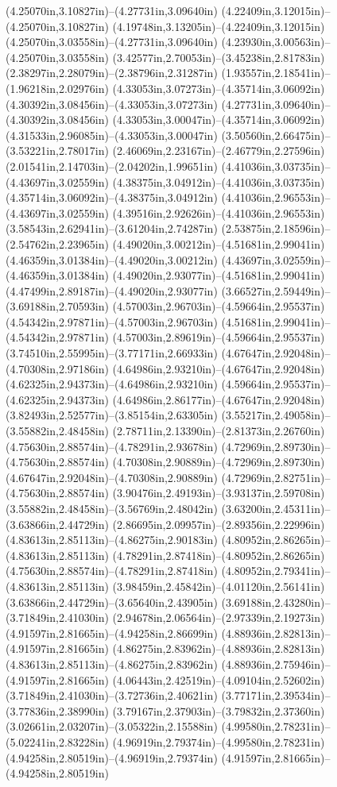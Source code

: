 (4.25070in,3.10827in)--(4.27731in,3.09640in) (4.22409in,3.12015in)--(4.25070in,3.10827in) (4.19748in,3.13205in)--(4.22409in,3.12015in) (4.25070in,3.03558in)--(4.27731in,3.09640in) (4.23930in,3.00563in)--(4.25070in,3.03558in) (3.42577in,2.70053in)--(3.45238in,2.81783in) (2.38297in,2.28079in)--(2.38796in,2.31287in) (1.93557in,2.18541in)--(1.96218in,2.02976in) (4.33053in,3.07273in)--(4.35714in,3.06092in) (4.30392in,3.08456in)--(4.33053in,3.07273in) (4.27731in,3.09640in)--(4.30392in,3.08456in) (4.33053in,3.00047in)--(4.35714in,3.06092in) (4.31533in,2.96085in)--(4.33053in,3.00047in) (3.50560in,2.66475in)--(3.53221in,2.78017in) (2.46069in,2.23167in)--(2.46779in,2.27596in) (2.01541in,2.14703in)--(2.04202in,1.99651in) (4.41036in,3.03735in)--(4.43697in,3.02559in) (4.38375in,3.04912in)--(4.41036in,3.03735in) (4.35714in,3.06092in)--(4.38375in,3.04912in) (4.41036in,2.96553in)--(4.43697in,3.02559in) (4.39516in,2.92626in)--(4.41036in,2.96553in) (3.58543in,2.62941in)--(3.61204in,2.74287in) (2.53875in,2.18596in)--(2.54762in,2.23965in) (4.49020in,3.00212in)--(4.51681in,2.99041in) (4.46359in,3.01384in)--(4.49020in,3.00212in) (4.43697in,3.02559in)--(4.46359in,3.01384in) (4.49020in,2.93077in)--(4.51681in,2.99041in) (4.47499in,2.89187in)--(4.49020in,2.93077in) (3.66527in,2.59449in)--(3.69188in,2.70593in) (4.57003in,2.96703in)--(4.59664in,2.95537in) (4.54342in,2.97871in)--(4.57003in,2.96703in) (4.51681in,2.99041in)--(4.54342in,2.97871in) (4.57003in,2.89619in)--(4.59664in,2.95537in) (3.74510in,2.55995in)--(3.77171in,2.66933in) (4.67647in,2.92048in)--(4.70308in,2.97186in) (4.64986in,2.93210in)--(4.67647in,2.92048in) (4.62325in,2.94373in)--(4.64986in,2.93210in) (4.59664in,2.95537in)--(4.62325in,2.94373in) (4.64986in,2.86177in)--(4.67647in,2.92048in) (3.82493in,2.52577in)--(3.85154in,2.63305in) (3.55217in,2.49058in)--(3.55882in,2.48458in) (2.78711in,2.13390in)--(2.81373in,2.26760in) (4.75630in,2.88574in)--(4.78291in,2.93678in) (4.72969in,2.89730in)--(4.75630in,2.88574in) (4.70308in,2.90889in)--(4.72969in,2.89730in) (4.67647in,2.92048in)--(4.70308in,2.90889in) (4.72969in,2.82751in)--(4.75630in,2.88574in) (3.90476in,2.49193in)--(3.93137in,2.59708in) (3.55882in,2.48458in)--(3.56769in,2.48042in) (3.63200in,2.45311in)--(3.63866in,2.44729in) (2.86695in,2.09957in)--(2.89356in,2.22996in) (4.83613in,2.85113in)--(4.86275in,2.90183in) (4.80952in,2.86265in)--(4.83613in,2.85113in) (4.78291in,2.87418in)--(4.80952in,2.86265in) (4.75630in,2.88574in)--(4.78291in,2.87418in) (4.80952in,2.79341in)--(4.83613in,2.85113in) (3.98459in,2.45842in)--(4.01120in,2.56141in) (3.63866in,2.44729in)--(3.65640in,2.43905in) (3.69188in,2.43280in)--(3.71849in,2.41030in) (2.94678in,2.06564in)--(2.97339in,2.19273in) (4.91597in,2.81665in)--(4.94258in,2.86699in) (4.88936in,2.82813in)--(4.91597in,2.81665in) (4.86275in,2.83962in)--(4.88936in,2.82813in) (4.83613in,2.85113in)--(4.86275in,2.83962in) (4.88936in,2.75946in)--(4.91597in,2.81665in) (4.06443in,2.42519in)--(4.09104in,2.52602in) (3.71849in,2.41030in)--(3.72736in,2.40621in) (3.77171in,2.39534in)--(3.77836in,2.38990in) (3.79167in,2.37903in)--(3.79832in,2.37360in) (3.02661in,2.03207in)--(3.05322in,2.15588in) (4.99580in,2.78231in)--(5.02241in,2.83228in) (4.96919in,2.79374in)--(4.99580in,2.78231in) (4.94258in,2.80519in)--(4.96919in,2.79374in) (4.91597in,2.81665in)--(4.94258in,2.80519in) 